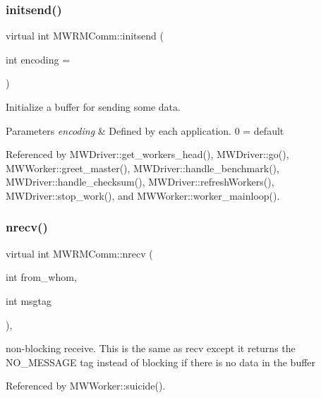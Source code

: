 \subsubsection{\texorpdfstring{initsend()}{initsend()}}
{\footnotesize\ttfamily virtual int M\+W\+R\+M\+Comm\+::initsend (\begin{DoxyParamCaption}\item[{int}]{encoding = {} }\end{DoxyParamCaption})\hspace{0.3cm}{\ttfamily [pure virtual]}}

Initialize a buffer for sending some data. 
\begin{DoxyParams}{Parameters}
{\em encoding} & Defined by each application. 0 = default \\
\hline
\end{DoxyParams}


Referenced by M\+W\+Driver\+::get\+\_\+workers\+\_\+head(), M\+W\+Driver\+::go(), M\+W\+Worker\+::greet\+\_\+master(), M\+W\+Driver\+::handle\+\_\+benchmark(), M\+W\+Driver\+::handle\+\_\+checksum(), M\+W\+Driver\+::refresh\+Workers(), M\+W\+Driver\+::stop\+\_\+work(), and M\+W\+Worker\+::worker\+\_\+mainloop().

\mbox{\label{classMWRMComm_a96b1eb6dd9c1d3f25ae63ac375f7206c}} 
\subsubsection{\texorpdfstring{nrecv()}{nrecv()}}
{\footnotesize\ttfamily virtual int M\+W\+R\+M\+Comm\+::nrecv (\begin{DoxyParamCaption}\item[{int}]{from\+\_\+whom,  }\item[{int}]{msgtag }\end{DoxyParamCaption})\hspace{0.3cm}{\ttfamily [inline]}, {\ttfamily [virtual]}}

non-\/blocking receive. This is the same as recv except it returns the N\+O\+\_\+\+M\+E\+S\+S\+A\+GE tag instead of blocking if there is no data in the buffer 

Referenced by M\+W\+Worker\+::suicide().

\mbox{\label{classMWRMComm_a10818d71f30ad62b5d747e0b5ef07d68}} 
